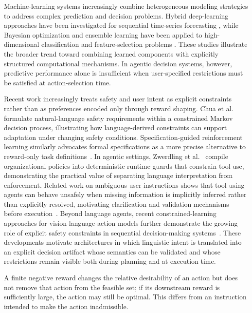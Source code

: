 \documentclass[journal]{IEEEtran}
\theoremstyle{definition}
\begin{document}
Machine-learning systems increasingly combine heterogeneous modeling
strategies to address complex prediction and decision problems.
Hybrid deep-learning approaches have been investigated for sequential
time-series forecasting \cite{Das2025PowerOutage}, while Bayesian
optimization and ensemble learning have been applied to high-dimensional
classification and feature-selection problems
\cite{Khan2024Tomato,Halder2025Landslide}. These studies illustrate the
broader trend toward combining learned components with explicitly
structured computational mechanisms. In agentic decision systems,
however, predictive performance alone is insufficient when user-specified
restrictions must be satisfied at action-selection time.

Recent work increasingly treats safety and user intent as explicit constraints rather than as preferences encoded only through reward shaping. Chua et al.~\cite{chua2025nlconstraints} formulate natural-language safety requirements within a constrained Markov decision process, illustrating how language-derived constraints can support adaptation under changing safety conditions. Specification-guided reinforcement learning similarly advocates formal specifications as a more precise alternative to reward-only task definitions~\cite{Jothimurugan2025SpecRL}. In agentic settings, Zwerdling et al.~\cite{Zwerdling2025Policy} compile organizational policies into deterministic runtime guards that constrain tool use, demonstrating the practical value of separating language interpretation from enforcement. Related work on ambiguous user instructions shows that tool-using agents can behave unsafely when missing information is implicitly inferred rather than explicitly resolved, motivating clarification and validation mechanisms before execution~\cite{Wang2025LearningToAsk}. Beyond language agents, recent constrained-learning approaches for vision-language-action models further demonstrate the growing role of explicit safety constraints in sequential decision-making systems~\cite{Zhang2025SafeVLA}. These developments motivate architectures in which linguistic intent is translated into an explicit decision artifact whose semantics can be validated and whose restrictions remain visible both during planning and at execution time.


A finite negative reward changes the relative desirability of an action
but does not remove that action from the feasible set; if its downstream
reward is sufficiently large, the action may still be optimal. This differs
from an instruction intended to make the action inadmissible.
\end{document}
